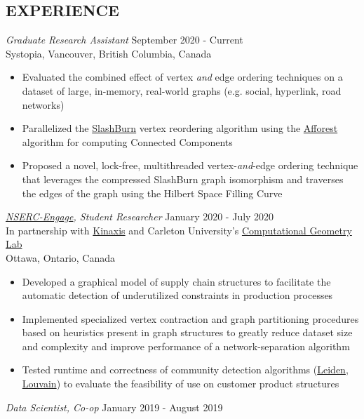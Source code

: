 \documentclass[margin]{res}
\begin{document}
\begin{resume}
\section{EXPERIENCE} 
{\sl Graduate Research Assistant} \hfill September 2020 - Current \\
Systopia, Vancouver, British Columbia, Canada
\begin{itemize}  \itemsep -2pt
      \item{Evaluated the combined effect of vertex \textit{and} edge ordering techniques on a dataset of large, in-memory, real-world graphs (e.g. social, hyperlink, road networks)}
      \item{Parallelized the \href{https://ieeexplore.ieee.org/document/6807798}{SlashBurn} vertex reordering algorithm using the \href{https://github.com/michaelsutton/afforest}{Afforest} algorithm for computing Connected Components}
      \item{Proposed a novel, lock-free, multithreaded vertex-\textit{and}-edge ordering technique that leverages the compressed SlashBurn graph isomorphism and traverses the edges of the graph using the Hilbert Space Filling Curve}
\end{itemize}
{\sl \href{https://www.nserc-crsng.gc.ca/Professors-Professeurs/RPP-PP/Engage-engagement_eng.asp}{NSERC-Engage}, Student Researcher} \hfill January 2020 - July 2020 \\
In partnership with \href{https://www.kinaxis.com/en}{Kinaxis} and Carleton University's \href{https://cglab.ca/}{Computational Geometry Lab}\\
Ottawa, Ontario, Canada
\begin{itemize}  \itemsep -2pt
      \item{Developed a graphical model of supply chain structures to facilitate the automatic detection of underutilized constraints in production processes}
      \item{Implemented specialized vertex contraction and graph partitioning procedures based on heuristics present in graph structures to greatly reduce dataset size and complexity and improve performance of a network-separation algorithm}
      \item{Tested runtime and correctness of community detection algorithms (\href{https://www.nature.com/articles/s41598-019-41695-z.pdf}{Leiden}, \href{https://arxiv.org/pdf/0803.0476.pdf}{Louvain}) to evaluate the feasibility of use on customer product structures}
\end{itemize}
{\sl Data Scientist, Co-op} \hfill January 2019 - August 2019 \\

\end{resume}
\end{document}
